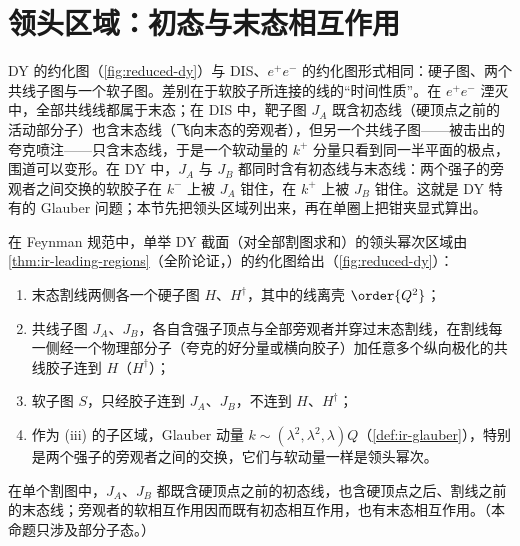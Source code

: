 \section{领头区域：初态与末态相互作用}\label{sec:dy-regions}

DY 的约化图（\cref{fig:reduced-dy}）与 DIS、$e^+e^-$ 的约化图形式相同：硬子图、两个共线子图与一个软子图。差别在于软胶子所连接的线的“时间性质”。在 $e^+e^-$ 湮灭中，全部共线线都属于末态；在 DIS 中，靶子图 $J_A$ 既含初态线（硬顶点之前的活动部分子）也含末态线（飞向末态的旁观者），但另一个共线子图——被击出的夸克喷注——只含末态线，于是一个软动量的 $k^+$ 分量只看到同一半平面的极点，围道可以变形。在 DY 中，$J_A$ 与 $J_B$ 都同时含有初态线与末态线：两个强子的旁观者之间交换的软胶子在 $k^-$ 上被 $J_A$ 钳住，在 $k^+$ 上被 $J_B$ 钳住。这就是 DY 特有的 Glauber 问题；本节先把领头区域列出来，再在单圈上把钳夹显式算出。

\begin{proposition}\label{prop:dy-regions}
在 Feynman 规范中，单举 DY 截面（对全部割图求和）的领头幂次区域由\cref{thm:ir-leading-regions}（全阶论证，\tagA）的约化图给出（\cref{fig:reduced-dy}）：
\begin{enumerate}[label=(\roman*),leftmargin=2.2em,itemsep=1pt,topsep=2pt]
\item 末态割线两侧各一个硬子图 $H$、$H^\dagger$，其中的线离壳 $\order{Q^2}$；
\item 共线子图 $J_A$、$J_B$，各自含强子顶点与全部旁观者并穿过末态割线，在割线每一侧经一个物理部分子（夸克的好分量或横向胶子）加任意多个纵向极化的共线胶子连到 $H$（$H^\dagger$）；
\item 软子图 $S$，只经胶子连到 $J_A$、$J_B$，不连到 $H$、$H^\dagger$；
\item 作为 (iii) 的子区域，Glauber 动量 $k\sim(\lambda^2,\lambda^2,\lambda)Q$（\cref{def:ir-glauber}），特别是两个强子的旁观者之间的交换，它们与软动量一样是领头幂次。
\end{enumerate}
在单个割图中，$J_A$、$J_B$ 都既含硬顶点之前的初态线，也含硬顶点之后、割线之前的末态线；旁观者的软相互作用因而既有初态相互作用，也有末态相互作用。（本命题只涉及部分子态。）
\end{proposition}

